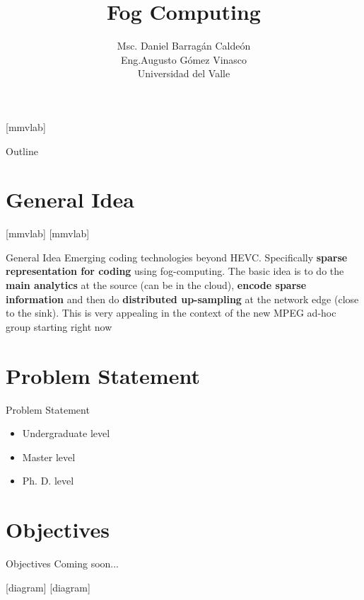 \documentclass{beamer}
\title[]{Fog Computing}
\author{Msc. Daniel Barrag\'an Calde\'on \\ Eng.Augusto G\'omez Vinasco \\
Universidad del Valle}
\begin{document}
[mmvlab]

\begin{frame}[plain]
  \titlepage
\end{frame}


\begin{frame}{Outline}
\begin{minipage}[t][4cm][t]{\textwidth}
\tableofcontents
\end{minipage}
\end{frame}

\section{General Idea}

[mmvlab]
[mmvlab]

\begin{frame}{General Idea}
\justifying
Emerging coding technologies beyond HEVC. Specifically \textbf{sparse representation for coding} using fog-computing. The basic idea is to do the \textbf{main analytics} at the source (can be in the cloud), \textbf{encode sparse information} and then do \textbf{distributed up-sampling} at the network edge (close to the sink). This is very appealing in the context of the new MPEG ad-hoc group starting right now
\end{frame}

\section{Problem Statement}

\begin{frame}{Problem Statement}
\begin{itemize}
\item Undergraduate level
\item Master level
\item Ph. D. level
\end{itemize}
\end{frame}

\section{Objectives}

\begin{frame}{Objectives}
Coming soon...
\end{frame}

[diagram]
[diagram]
\end{document}
